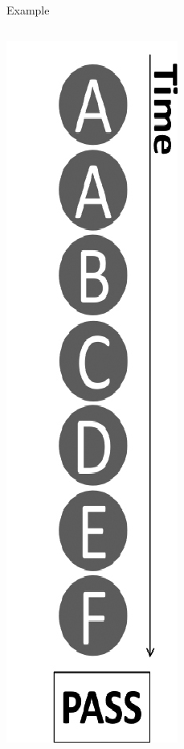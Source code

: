 \documentclass{beamer}
\begin{document}
\begin{frame}{Example}
  \begin{columns}
    \begin{column}{0.35\textwidth}
      \begin{center}
        \includegraphics[height=0.75\textheight]{fig1_2}
      \end{center}
    \end{column}
    \begin{column}{0.7\textwidth}
      \begin{center}

\end{center}
\end{column}
\end{columns}
\end{frame}
\end{document}
